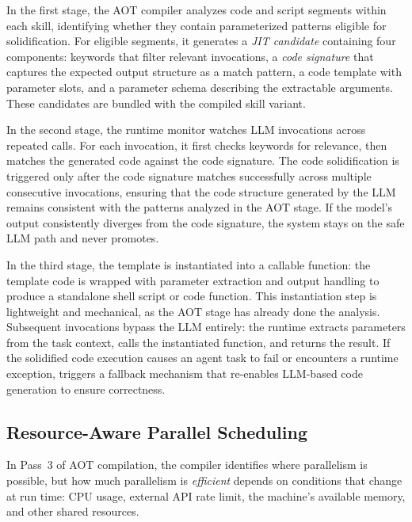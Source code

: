 In the first stage, the AOT compiler analyzes code and
script segments within each skill, identifying whether
they contain parameterized patterns eligible for
solidification. For eligible segments, it generates a
\emph{JIT candidate} containing four components: keywords
that filter relevant invocations, a \emph{code signature}
that captures the expected output structure as a match
pattern, a code template with parameter slots, and a
parameter schema describing the extractable arguments.
These candidates are bundled with the compiled skill variant.

In the second stage, the runtime monitor watches LLM
invocations across repeated calls. For each invocation,
it first checks keywords for relevance, then matches the
generated code against the code signature. 
The code solidification is triggered only after
the code signature matches successfully across multiple consecutive invocations,
ensuring that the code structure generated by the LLM remains consistent with the patterns analyzed in the AOT stage.
If the model's output consistently
diverges from the code signature, the system stays on
the safe LLM path and never promotes.


In the third stage, the template is instantiated into a callable
function: the template code is wrapped with parameter
extraction and output handling to produce a standalone
shell script or code function. This instantiation step
is lightweight and mechanical, as the AOT stage has already
done the analysis. Subsequent invocations bypass the LLM
entirely: the runtime extracts parameters from the task
context, calls the instantiated function, and returns the
result. If the solidified code execution causes an agent
task to fail or encounters a runtime exception, \sys triggers
a fallback mechanism that re-enables LLM-based code generation
to ensure correctness.

\subsection{Resource-Aware Parallel Scheduling}
\label{sec:runtime:sched}

In Pass~3 of AOT compilation, the compiler identifies where parallelism is
possible, but how much parallelism is \emph{efficient}
depends on conditions that change at run time: CPU usage,
external API rate limit, the machine's available
memory, and other shared resources.

